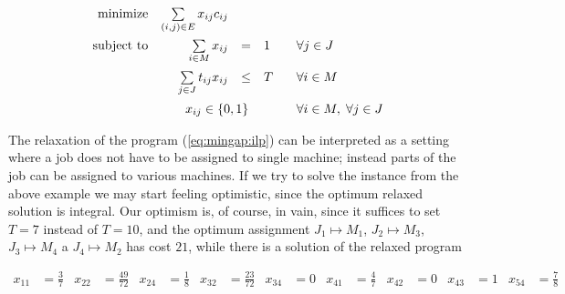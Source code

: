 \begin{equation}
\label{eq:mingap:ilp}
\begin{array}{rrcll}
  {\rm minimize}     & \multicolumn{1}{l}{ \sum\limits_{(i,j)\in E}x_{ij}c_{ij}}\\[3ex]
  {\rm subject\ to} & \sum\limits_{i\in M} x_{ij}& = &1 & \;\;\; \forall j\in J\\[3ex]
                          & \sum\limits_{j\in J} t_{ij}x_{ij}&\le & T & \;\;\; \forall i\in M\\[3ex]
                          & \multicolumn{3}{c}{ x_{ij}\in\{0,1\}} & \;\;\; \forall i\in M, \; \forall j\in J
\end{array}
\end{equation}

\noindent
The relaxation of the program (\ref{eq:mingap:ilp}) can be interpreted as a setting where a job does not have
to be assigned to single machine; instead parts of the job can be assigned to various machines. If we try to solve
the instance from the above example we may start feeling optimistic, since the optimum relaxed solution 
is integral. Our optimism is, of course, in vain, since it suffices to set $T=7$ instead of $T=10$, and the 
optimum assignment  $J_1\mapsto M_1$, $J_2\mapsto M_3$, $J_3\mapsto M_4$ a $J_4\mapsto M_2$ has cost $21$,
while there is a solution of the relaxed program

\begin{align*}
  x_{11} &=\frac{3}{7} &
  x_{22} &=\frac{49}{72} &
  x_{24} &=\frac{1}{8} & 
  x_{32} &=\frac{23}{72} &
  x_{34} &=0 &
  x_{41} &=\frac{4}{7} &
  x_{42} &=0 &
  x_{43} &=1 &
  x_{54} &=\frac{7}{8}
\end{align*}

